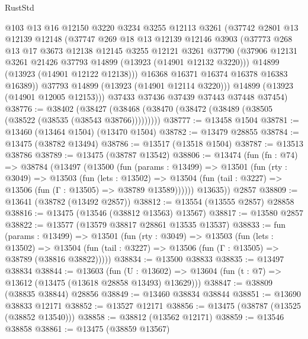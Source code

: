 \begin{lexlean}{RustStd}
\begin{coremodule}
          @103
          @13
          @16
          @12150
          @3220
          @3234
          @3255
          @12113
          @3261
          (@37742
            @2801
            @13
            @12139
            @12148
            (@37747
              @269
              @18
              @13
              @12139
              @12146
              @3903
              (@37773
                @268
                @13
                @17
                @3673
                @12138
                @12145
                @3255
                @12121
                @3261
                @37790
                (@37906 @12131 @3261 @21426 @37793 @14899 (@13923 (@14901 @12132 @3220)))
                @14899
                (@13923 (@14901 @12122 @12138)))
              @16368
              @16371
              @16374
              @16378
              @16383
              @16389))
          @37793
          @14899
          (@13923 (@14901 @12114 @3220)))
        @14899
        (@13923 (@14901 @12005 @12153)))
      @37433
      @37436
      @37439
      @37443
      @37448
      @37454)
@38776 := @38402
    (@38427 (@38468 (@38470 (@38472 (@38489 (@38505 (@38522 (@38535 (@38543 @38766)))))))))
@38777 := @13458 @1504
@38781 := @13460 (@13464 @1504) (@13470 @1504)
@38782 := @13479 @28855
@38784 := @13475 (@38782 @13494)
@38786 := @13517 (@13518 @1504)
@38787 := @13513 @38786
@38789 := @13475 (@38787 @13542)
@38806 := @13474
    (fun (fn : @74) =>
    @38784
      (@13497
        (@13500
          (fun (params : @13499) =>
          @13501
            (fun (rty : @3049) =>
            @13503
              (fun (lets : @13502) =>
              @13504 (fun (tail : @3227) => @13506 (fun (Γ : @13505) => @38789 @13589))))))
        @13635))
    @2857
@38809 := @13641 (@38782 (@13492 @2857))
@38812 := @13554 (@13555 @2857) @28858
@38816 := @13475 (@13546 (@38812 @13563) @13567)
@38817 := @13580 @2857
@38822 := @13577 (@13579 @38817 @28861 @13535 @13537)
@38833 := fun (params : @13499) =>
  @13501
    (fun (rty : @3049) =>
    @13503
      (fun (lets : @13502) =>
      @13504 (fun (tail : @3227) => @13506 (fun (Γ : @13505) => @38789 (@38816 @38822)))))
@38834 := @13500 @38833
@38835 := @13497 @38834
@38844 := @13603
    (fun (U : @13602) => @13604 (fun (t : @7) => @13612 (@13475 (@13618 @28858 @13493) @13629)))
@38847 := @38809 (@38835 @38844) @28856
@38849 := @13460 @38834 @38844
@38851 := @13690 @38833 @12171
@38852 := @13527 @12171
@38856 := @13475 (@38787 (@13525 (@38852 @13540)))
@38858 := @38812 (@13562 @12171)
@38859 := @13546 @38858
@38861 := @13475 (@38859 @13567)

\end{coremodule}
\end{lexlean}
